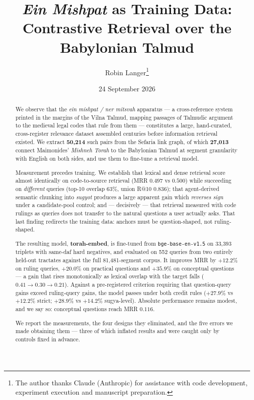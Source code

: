 \documentclass[11pt,a4paper]{article}
\title{\emph{Ein Mishpat} as Training Data:\\
Contrastive Retrieval over the Babylonian Talmud}
\author{Robin Langer\thanks{The author thanks Claude (Anthropic) for assistance with
code development, experiment execution and manuscript preparation.}}
\date{24 September 2026}
\begin{document}
\maketitle

\begin{abstract}
We observe that the \emph{ein mishpat / ner mitsvah} apparatus --- a
cross-reference system printed in the margins of the Vilna Talmud, mapping
passages of Talmudic argument to the medieval legal codes that rule from them
--- constitutes a large, hand-curated, cross-register relevance dataset
assembled centuries before information retrieval existed. We extract
\textbf{50{,}214} such pairs from the Sefaria link graph, of which
\textbf{27{,}013} connect Maimonides' \emph{Mishneh Torah} to the Babylonian
Talmud at segment granularity with English on both sides, and use them to
fine-tune a retrieval model.

Measurement precedes training. We establish that lexical and dense retrieval
score almost identically on code-to-source retrieval (MRR $0.497$ vs $0.500$)
while succeeding on \emph{different} queries (top-10 overlap $63\%$, union R@10
$0.836$); that agent-derived semantic chunking into \emph{sugyot} produces a
large apparent gain which \emph{reverses sign} under a candidate-pool control;
and --- decisively --- that retrieval measured with code rulings as queries does
not transfer to the natural questions a user actually asks. That last finding
redirects the training data: anchors must be question-shaped, not ruling-shaped.

The resulting model, \textbf{torah-embed}, is fine-tuned from
\texttt{bge-base-en-v1.5} on 33{,}393 triplets with same-daf hard negatives, and
evaluated on 552 queries from two entirely held-out tractates against the full
81{,}481-segment corpus. It improves MRR by $+12.2\%$ on ruling queries,
$+20.0\%$ on practical questions and $\mathbf{+35.9\%}$ on conceptual questions
--- a gain that rises monotonically as lexical overlap with the target falls
($0.41 \to 0.30 \to 0.21$). Against a pre-registered criterion requiring that
question-query gains exceed ruling-query gains, the model passes under both
credit rules ($+27.9\%$ vs $+12.2\%$ strict; $+28.9\%$ vs $+14.2\%$
sugya-level). Absolute performance remains modest, and we say so: conceptual
questions reach MRR $0.116$.

We report the measurements, the four designs they eliminated, and the five
errors we made obtaining them --- three of which inflated results and were
caught only by controls fixed in advance.
\end{abstract}
\end{document}
